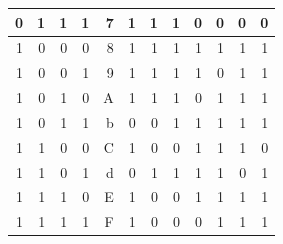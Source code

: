 \documentclass[11pt,UTF8]{ctexart}
\begin{document}
\begin{table}[H]
\begin{tabular}{|r|r|r|r|r|r|r|r|r|r|r|r|}
\hline    0     & 1     & 1     & 1     & 7     & \textcolor[rgb]{ 1,  0,  0}{1} & \textcolor[rgb]{ 1,  0,  0}{1} & \textcolor[rgb]{ 1,  0,  0}{1} & 0     & 0     & 0     & 0       \\
\hline    1     & 0     & 0     & 0     & 8     & \textcolor[rgb]{ 1,  0,  0}{1} & \textcolor[rgb]{ 1,  0,  0}{1} & \textcolor[rgb]{ 1,  0,  0}{1} & \textcolor[rgb]{ 1,  0,  0}{1} & \textcolor[rgb]{ 1,  0,  0}{1} & \textcolor[rgb]{ 1,  0,  0}{1} & \textcolor[rgb]{ 1,  0,  0}{1}   \\
\hline    1     & 0     & 0     & 1     & 9     & \textcolor[rgb]{ 1,  0,  0}{1} & \textcolor[rgb]{ 1,  0,  0}{1} & \textcolor[rgb]{ 1,  0,  0}{1} & \textcolor[rgb]{ 1,  0,  0}{1} & 0     & \textcolor[rgb]{ 1,  0,  0}{1} & \textcolor[rgb]{ 1,  0,  0}{1}   \\
\hline    1     & 0     & 1     & 0     & A     & \textcolor[rgb]{ 1,  0,  0}{1} & \textcolor[rgb]{ 1,  0,  0}{1} & \textcolor[rgb]{ 1,  0,  0}{1} & 0     & \textcolor[rgb]{ 1,  0,  0}{1} & \textcolor[rgb]{ 1,  0,  0}{1} & \textcolor[rgb]{ 1,  0,  0}{1}   \\
\hline    1     & 0     & 1     & 1     & b     & 0     & 0     & \textcolor[rgb]{ 1,  0,  0}{1} & \textcolor[rgb]{ 1,  0,  0}{1} & \textcolor[rgb]{ 1,  0,  0}{1} & \textcolor[rgb]{ 1,  0,  0}{1} & \textcolor[rgb]{ 1,  0,  0}{1}   \\
\hline    1     & 1     & 0     & 0     & C     & \textcolor[rgb]{ 1,  0,  0}{1} & 0     & 0     & \textcolor[rgb]{ 1,  0,  0}{1} & \textcolor[rgb]{ 1,  0,  0}{1} & \textcolor[rgb]{ 1,  0,  0}{1} & 0       \\
\hline    1     & 1     & 0     & 1     & d     & 0     & \textcolor[rgb]{ 1,  0,  0}{1} & \textcolor[rgb]{ 1,  0,  0}{1} & \textcolor[rgb]{ 1,  0,  0}{1} & \textcolor[rgb]{ 1,  0,  0}{1} & 0     & \textcolor[rgb]{ 1,  0,  0}{1}   \\
\hline    1     & 1     & 1     & 0     & E     & \textcolor[rgb]{ 1,  0,  0}{1} & 0     & 0     & \textcolor[rgb]{ 1,  0,  0}{1} & \textcolor[rgb]{ 1,  0,  0}{1} & \textcolor[rgb]{ 1,  0,  0}{1} & \textcolor[rgb]{ 1,  0,  0}{1}   \\
\hline    1     & 1     & 1     & 1     & F     & \textcolor[rgb]{ 1,  0,  0}{1} & 0     & 0     & 0     & \textcolor[rgb]{ 1,  0,  0}{1} & \textcolor[rgb]{ 1,  0,  0}{1} & \textcolor[rgb]{ 1,  0,  0}{1}   \\
\hline    \end{tabular}%
  \label{tab:addlabel}%
\end{table}%
\end{document}
